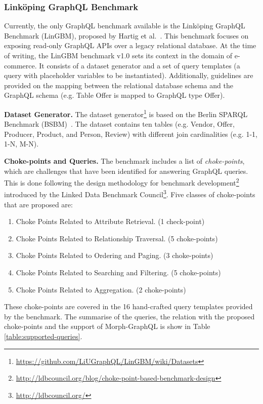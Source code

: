 \subsubsection{Link\"{o}ping GraphQL Benchmark} 
Currently, the only GraphQL benchmark available is the Link\"{o}ping GraphQL Benchmark (LinGBM), proposed by Hartig et al.~\citep{hartig2019LinGBM}. This benchmark focuses on exposing read-only GraphQL APIs over a legacy relational database. At the time of writing, the LinGBM benchmark v1.0 sets its context in the domain of e-commerce. It consists of a dataset generator and a set of query templates (a query with placeholder variables to be instantiated). Additionally, guidelines are provided on the mapping between the relational database schema and the GraphQL schema (e.g. Table Offer is mapped to GraphQL type Offer). 

\textbf{Dataset Generator.}
The dataset generator\footnote{\url{https://github.com/LiUGraphQL/LinGBM/wiki/Datasets}} is based on the Berlin SPARQL Benchmark (BSBM)~\citep{bizer2009berlin}. The dataset contains ten tables (e.g.  Vendor, Offer, Producer, Product, and Person, Review) with different join cardinalities (e.g. 1-1, 1-N, M-N).

\textbf{Choke-points and Queries.} 
The benchmark includes a list of \textit{choke-points}, which are challenges that have been identified for answering GraphQL queries. This is done following the design methodology for benchmark development\footnote{\url{http://ldbcouncil.org/blog/choke-point-based-benchmark-design}} introduced by the Linked Data Benchmark Council\footnote{\url{http://ldbcouncil.org/}}. Five classes of choke-points that are proposed are: 
\begin{enumerate}
    \item Choke Points Related to Attribute Retrieval. (1 check-point)
    \item Choke Points Related to Relationship Traversal. (5 choke-points)
    \item Choke Points Related to Ordering and Paging. (3 choke-points)
    \item Choke Points Related to Searching and Filtering. (5 choke-points)
    \item Choke Points Related to Aggregation. (2 choke-points)
\end{enumerate}

These choke-points are covered in the 16 hand-crafted query templates provided by the benchmark. The summarise of the queries, the relation with the proposed choke-points and the support of Morph-GraphQL is show in Table \ref{table:supported-queries}.


